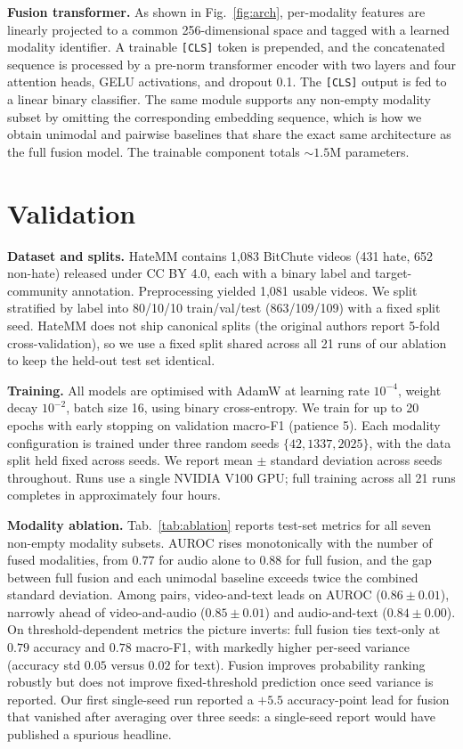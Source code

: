\documentclass{article}
\begin{document}
\textbf{Fusion transformer.} As shown in Fig.~\ref{fig:arch}, per-modality features are linearly projected to a common 256-dimensional space and tagged with a learned modality identifier. A trainable \texttt{[CLS]} token is prepended, and the concatenated sequence is processed by a pre-norm transformer encoder \cite{vaswani2017attention} with two layers and four attention heads, GELU activations, and dropout 0.1. The \texttt{[CLS]} output is fed to a linear binary classifier. The same module supports any non-empty modality subset by omitting the corresponding embedding sequence, which is how we obtain unimodal and pairwise baselines that share the exact same architecture as the full fusion model. The trainable component totals ${\sim}1.5$M parameters.

\section{Validation}
\label{sec:validation}

\textbf{Dataset and splits.} HateMM \cite{das2023hatemm} contains 1,083 BitChute videos (431 hate, 652 non-hate) released under CC BY 4.0, each with a binary label and target-community annotation. Preprocessing yielded 1,081 usable videos. We split stratified by label into 80/10/10 train/val/test (863/109/109) with a fixed split seed. HateMM does not ship canonical splits (the original authors report 5-fold cross-validation), so we use a fixed split shared across all 21 runs of our ablation to keep the held-out test set identical.

\textbf{Training.} All models are optimised with AdamW \cite{loshchilov2019adamw} at learning rate $10^{-4}$, weight decay $10^{-2}$, batch size 16, using binary cross-entropy. We train for up to 20 epochs with early stopping on validation macro-F1 (patience 5). Each modality configuration is trained under three random seeds $\{42, 1337, 2025\}$, with the data split held fixed across seeds. We report mean $\pm$ standard deviation across seeds throughout. Runs use a single NVIDIA V100 GPU; full training across all 21 runs completes in approximately four hours.

\textbf{Modality ablation.} Tab.~\ref{tab:ablation} reports test-set metrics for all seven non-empty modality subsets. AUROC rises monotonically with the number of fused modalities, from $0.77$ for audio alone to $0.88$ for full fusion, and the gap between full fusion and each unimodal baseline exceeds twice the combined standard deviation. Among pairs, video-and-text leads on AUROC ($0.86 \pm 0.01$), narrowly ahead of video-and-audio ($0.85 \pm 0.01$) and audio-and-text ($0.84 \pm 0.00$). On threshold-dependent metrics the picture inverts: full fusion ties text-only at $0.79$ accuracy and $0.78$ macro-F1, with markedly higher per-seed variance (accuracy std $0.05$ versus $0.02$ for text). Fusion improves probability ranking robustly but does not improve fixed-threshold prediction once seed variance is reported. Our first single-seed run reported a $+5.5$ accuracy-point lead for fusion that vanished after averaging over three seeds: a single-seed report would have published a spurious headline.
\end{document}
